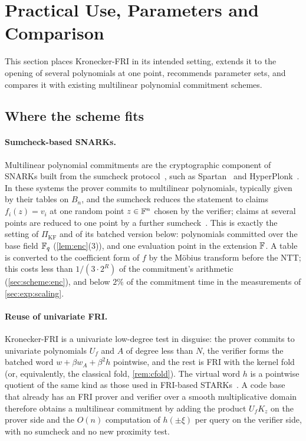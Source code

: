 \section{Practical Use, Parameters and Comparison}\label{sec:apps}

This section places Kronecker-FRI in its intended setting, extends it to the opening of several polynomials at one point, recommends parameter sets, and compares it with existing multilinear polynomial commitment schemes.

\subsection{Where the scheme fits}\label{sec:apps:fit}

\paragraph{Sumcheck-based SNARKs.}
Multilinear polynomial commitments are the cryptographic component of SNARKs built from the sumcheck protocol~\cite{LFKN92}, such as Spartan~\cite{Set20} and HyperPlonk~\cite{CBBZ23}.
In these systems the prover commits to multilinear polynomials, typically given by their tables on $B_n$, and the sumcheck reduces the statement to claims $f_i(z) = v_i$ at one random point $z \in \mathbb{F}^n$ chosen by the verifier; claims at several points are reduced to one point by a further sumcheck~\cite{CBBZ23}.
This is exactly the setting of $\Pi_{\mathrm{KF}}$ and of its batched version below: polynomials committed over the base field $\mathbb{F}_q$ (\cref{lem:enc}(3)), and one evaluation point in the extension $\mathbb{F}$.
A table is converted to the coefficient form of $f$ by the M\"obius transform before the NTT; this costs less than $1/(3 \cdot 2^R)$ of the commitment's arithmetic (\cref{sec:scheme:enc}), and below $2\%$ of the commitment time in the measurements of \cref{sec:exp:scaling}.

\paragraph{Reuse of univariate FRI.}
Kronecker-FRI is a univariate low-degree test in disguise: the prover commits to univariate polynomials $U_f$ and $A$ of degree less than $N$, the verifier forms the batched word $w + \beta w_A + \beta^2 h$ pointwise, and the rest is FRI with the kernel fold (or, equivalently, the classical fold, \cref{rem:cfold}).
The virtual word $h$ is a pointwise quotient of the same kind as those used in FRI-based STARKs~\cite{BCRSVW19}.
A code base that already has an FRI prover and verifier over a smooth multiplicative domain therefore obtains a multilinear commitment by adding the product $U_f K_z$ on the prover side and the $O(n)$ computation of $h(\pm\xi)$ per query on the verifier side, with no sumcheck and no new proximity test.

